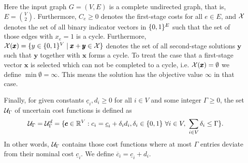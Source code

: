 Here the input graph $G = (V,E)$ is a complete undirected graph, that is, $E = {V \choose 2}$.
Furthermore, $C_e \geq 0$ denotes the first-stage costs for all $e \in E$, and $\mathcal{X}$ denotes the set of all binary indicator vectors in $\{ 0,1 \}^E$ such that the set of those edges with $x_e=1$ is a  cycle.
 Furthermore, $\mathcal{X}(\pmb x) = \{ y \in \{ 0,1 \}^V \mid \pmb x + \pmb y \in \mathcal{X} \}$ denotes the set of all second-stage solutions $\pmb y$ such that $\pmb y$ together with $\pmb x$ forms a  cycle.
 To treat the case that a first-stage vector $\pmb x$ is selected which can not be completed to a  cycle, i.e. $\mathcal{X}(\pmb x) = \emptyset$ we define $\min \emptyset = \infty$.
 This means the solution has the objective value $\infty$ in that case.

Finally, for given constants $\underline{c}_i, d_i \geq 0$ for all $i \in V$ and some integer $\Gamma \geq 0$, the set $\mathcal{U}_\Gamma$ of uncertain cost functions is defined as
\[
\mathcal{U}_\Gamma = \mathcal{U}_\Gamma^d = \{  \pmb c \in \mathbb{R}^V : c_i = \underline{c}_i + \delta_id_i, \delta_i \in \{ 0,1 \}\ \forall i \in V,\ \sum_{i \in V}\delta_i \leq \Gamma  \}.
\]
In other words, $\mathcal{U}_\Gamma$ contains those cost functions where at most $\Gamma$ entries deviate from their nominal cost $\underline{c}_i$. We define $\overline{c}_i = \underline{c}_i + d_i$. 

